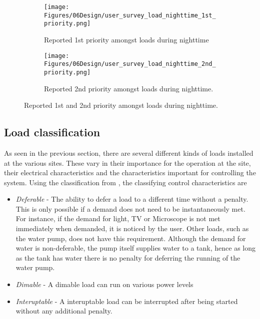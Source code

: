 \begin{figure}[!h]
  \centering

  \begin{subfigure}{\textwidth}
    \centering
    \texttt{[image: Figures/06Design/user\_survey\_load\_nighttime\_1st\_priority.png]}
    \caption[User survey: Nighttime 1st priority]{Reported 1st priority amongst loads during nighttime}
    \label{fig:user_survey_load_nighttime_1st_priority}
  \end{subfigure}

  \vspace{0.5cm}

  \begin{subfigure}{\textwidth}
    \centering
    \texttt{[image: Figures/06Design/user\_survey\_load\_nighttime\_2nd\_priority.png]}
    \caption[User survey: Nighttime 2nd priority]{Reported 2nd priority amongst loads during nighttime.}
    \label{fig:user_survey_load_nighttime_2nd_priority}
  \end{subfigure}

  \caption[User survey: Nighttime priority]{Reported 1st and 2nd priority amongst loads during nighttime.}
  \label{fig:user_survey_load_nighttime_1st&2nd_priority}
\end{figure}



\subsection{Load classification}\label{seq:load_classification}
As seen in the previous section, there are several different kinds of loads installed at the various sites. These vary in their importance for the operation at the site, their electrical characteristics and the characteristics important for controlling the system. Using the classification from \cite{Philipo2022-rx}, the classifying control characteristics are 
\begin{itemize}
    \item \textit{Deferable} -   The ability to defer a load to a different time without a penalty. This is only possible if a demand does not need to be instantaneously met. For instance, if the demand for light, TV or Microscope is not met immediately when demanded, it is noticed by the user. Other loads, such as the water pump, does not have this requirement. Although the demand for water is non-deferable, the pump itself supplies water to a tank, hence as long as the tank has water there is no penalty for deferring the running of the water pump. 
    \item \textit{Dimable}  -   A dimable load can run on various power levels
    \item \textit{Interuptable} -   A interuptable load can be interrupted after being started without any additional penalty. 
\end{itemize}

